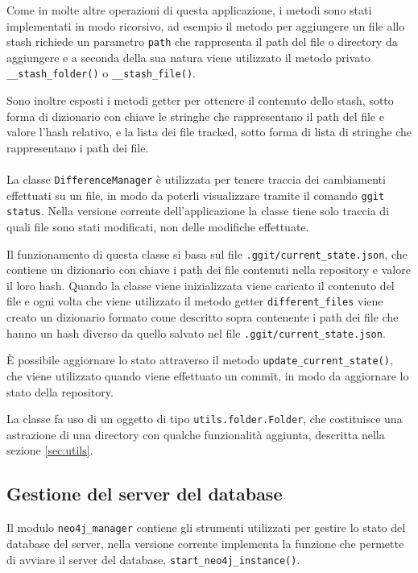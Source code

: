 Come in molte altre operazioni di questa applicazione, i metodi sono stati implementati in modo ricorsivo, ad esempio il metodo per aggiungere un file allo stash richiede un parametro \texttt{path} che rappresenta il path del file o directory da aggiungere e a seconda della sua natura viene utilizzato il metodo privato \texttt{\_\_stash\_folder()} o \texttt{\_\_stash\_file()}.

Sono inoltre esposti i metodi getter per ottenere il contenuto dello stash, sotto forma di dizionario con chiave le stringhe che rappresentano il path del file e valore l'hash relativo, e la lista dei file tracked, sotto forma di lista di stringhe che rappresentano i path dei file.
\\~\\
La classe \texttt{DifferenceManager} è utilizzata per tenere traccia dei cambiamenti effettuati su un file, in modo da poterli visualizzare tramite il comando \texttt{ggit status}. Nella versione corrente dell'applicazione la classe tiene solo traccia di quali file sono stati modificati, non delle modifiche effettuate.

Il funzionamento di questa classe si basa sul file \texttt{.ggit/current\_state.json}, che contiene un dizionario con chiave i path dei file contenuti nella repository e valore il loro hash. Quando la classe viene inizializzata viene caricato il contenuto del file e ogni volta che viene utilizzato il metodo getter \texttt{different\_files} viene creato un dizionario formato come descritto sopra contenente i path dei file che hanno un hash diverso da quello salvato nel file \texttt{.ggit/current\_state.json}.

È possibile aggiornare lo stato attraverso il metodo \texttt{update\_current\_state()}, che viene utilizzato quando viene effettuato un commit, in modo da aggiornare lo stato della repository.

La classe fa uso di un oggetto di tipo \texttt{utils.folder.Folder}, che costituisce una astrazione di una directory con qualche funzionalità aggiunta, descritta nella sezione \ref{sec:utils}.

\subsection{Gestione del server del database}
Il modulo \texttt{neo4j\_manager} contiene gli strumenti utilizzati per gestire lo stato del database del server, nella versione corrente implementa la funzione che permette di avviare il server del database, \texttt{start\_neo4j\_instance()}. 

